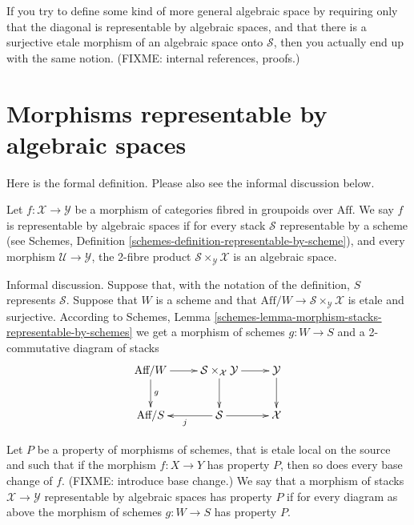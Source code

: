 \begin{remark}
\label{remark-definition-correct}
If you try to define some kind of more general algebraic space by requiring
only that the diagonal is representable by algebraic spaces, and that there is
a surjective etale morphism of an algebraic space onto $\mathcal{S}$, then 
you actually end up with the same notion.
(FIXME: internal references, proofs.)
\end{remark}

\section{Morphisms representable by algebraic spaces}
\label{section-morphism-representable-by-algebraic-spaces}

\noindent
Here is the formal definition. Please also see the informal discussion below.

\begin{definition}
\label{definition-representable-by-algebraic-spaces}
Let $f : \mathcal{X} \to \mathcal{Y}$ be a morphism of categories
fibred in groupoids over $\text{Aff}$. We say $f$ is representable by
algebraic spaces if for every stack $\mathcal{S}$ representable by a scheme
(see Schemes, Definition \ref{schemes-definition-representable-by-scheme}),
and every morphism $\mathcal{U} \to \mathcal{Y}$, the 2-fibre product
$\mathcal{S}\times_\mathcal{Y}\mathcal{X}$ is an algebraic space.
\end{definition}

\noindent
Informal discussion. Suppose that, with the notation of the definition,
$S$ represents $\mathcal{S}$. Suppose that $W$ is a scheme and that
$\text{Aff}/W \to \mathcal{S}\times_\mathcal{Y}\mathcal{X}$ is 
etale and surjective. According to
Schemes, Lemma \ref{schemes-lemma-morphism-stacks-representable-by-schemes}
we get a morphism of schemes $g : W \to S$ and a 2-commutative diagram
of stacks
$$
\xymatrix{
\text{Aff}/W \ar[d]^g \ar[r] &
\mathcal{S}\times_\mathcal{X}\mathcal{Y} \ar[d] \ar[r] &
\mathcal{Y} \ar[d] \\
\text{Aff}/S &
\mathcal{S} \ar[l]^j \ar[r] & \mathcal{X}
}
$$

\begin{definition}
\label{definition-property-morphism-representable-by-algebraic-spaces}
Let $P$ be a property of morphisms of schemes, that is etale local
on the source and such that if the morphism $f : X \to Y$ has property $P$,
then so does every base change of $f$. (FIXME: introduce base change.)
We say that a morphism of stacks $\mathcal{X}
\to \mathcal{Y}$ representable by algebraic spaces has property
$P$ if for every diagram as above the morphism of schemes
$g : W \to S$ has property $P$.
\end{definition}


